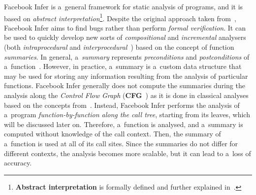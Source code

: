 \documentclass{ExcelAtFIT}
\theoremstyle{definition}
\begin{document}
Facebook Infer is a~general framework for static analysis of programs, and it is based on \emph{abstract interpretation}\footnote{\textbf{Abstract interpretation} is formally defined and further explained in~\cite{AILatticeModelCousot, staticAnalysisMoller, programAnalysisNielson, staticAnalysisRival}.}. Despite the original approach taken from~\cite{inferBiabduction}, Facebook Infer aims to find bugs rather than perform \emph{formal verification}. It can be used to quickly develop new sorts of \emph{compositional} and \emph{incremental} analysers (both \emph{intraprocedural} and \emph{interprocedural}~\cite{programAnalysisNielson}) based on the concept of function \emph{summaries}. In general, a~\emph{summary} represents \emph{preconditions} and \emph{postconditions} of a~function~\cite{hoare}. However, in practice, a~summary is a~custom data structure that may be used for storing any information resulting from the analysis of particular functions. Facebook Infer generally does not compute the summaries during the analysis along the \emph{Control Flow Graph} (\textbf{CFG}~\cite{controlFlowAnalysisAllen}) as it is done in classical analyses based on the concepts from~\cite{DFAGraphReach, DFAApproaches}. Instead, Facebook Infer performs the analysis of a~program \emph{function-by-function along the call tree}, starting from its leaves, which will be discussed later on. Therefore, a~function is analysed, and a~summary is computed without knowledge of the call context. Then, the summary of a~function is used at all of its call sites. Since the summaries do not differ for different contexts, the analysis becomes more scalable, but it can lead to a~loss of accuracy.
\end{document}
